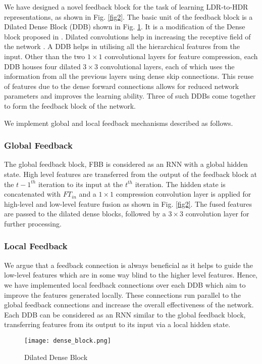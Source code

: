 \documentclass[conference]{IEEEtran}
\begin{document}
We have designed a novel feedback block for the task of learning LDR-to-HDR representations, as shown in Fig. \ref{fig2}. 
The basic unit of the feedback block is a Dilated Dense Block (DDB) shown in Fig. \ref{fig3}. It is a modification of the Dense block proposed in \cite{huang2017densely}. Dilated convolutions help in increasing the receptive field of the network \cite{yu2015multi}. 
A DDB helps in utilising all the hierarchical features from the input. 
Other than the two $1 \times 1$ convolutional layers for feature compression, each DDB houses four dilated $3 \times 3$ convolutional layers, each of which uses the information from all the previous layers using dense skip connections. This reuse of features due to the dense forward connections allows for reduced network parameters and improves the learning ability. Three of such DDBs come together to form the feedback block of the network.

We implement global and local feedback mechanisms described as follows.
\subsubsection{Global Feedback} The global feedback block, FBB is considered as an RNN with a global hidden state. High level features are transferred from the output of the feedback block at the $t-1^{th}$ iteration to its input at the $t^{th}$ iteration. The hidden state is concatenated with $FT_{in}$ and a $1 \times 1$ compression convolution layer is applied for high-level and low-level feature fusion as shown in Fig. \ref{fig2}. The fused features are passed to the dilated dense blocks, followed by a $3 \times 3$ convolution layer for further processing.

\subsubsection{Local Feedback} We argue that a feedback connection is always beneficial as it helps to guide the low-level features which are in some way blind to the higher level features. Hence, we have implemented local feedback connections over each DDB which aim to improve the features generated locally. These connections run parallel to the global feedback connections and increase the overall effectiveness of the network. Each DDB can be considered as an RNN similar to the global feedback block, transferring features from its output to its input via a local hidden state.\\[-3.5ex]
\begin{figure}[htbp]
\centering
\texttt{[image: dense\_block.png]}
\caption{Dilated Dense Block\\[-4ex]} 
\label{fig3}
\end{figure}
\end{document}
